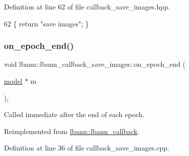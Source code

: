 Definition at line 62 of file callback\+\_\+save\+\_\+images.\+hpp.


\begin{DoxyCode}
62 \{ \textcolor{keywordflow}{return} \textcolor{stringliteral}{"save images"}; \}
\end{DoxyCode}
\mbox{\label{classlbann_1_1lbann__callback__save__images_aa540916eef9b95db68889a8a7426779c}} 
\subsubsection{\texorpdfstring{on\+\_\+epoch\+\_\+end()}{on\_epoch\_end()}}
{\footnotesize\ttfamily void lbann\+::lbann\+\_\+callback\+\_\+save\+\_\+images\+::on\+\_\+epoch\+\_\+end (\begin{DoxyParamCaption}\item[{\hyperlink{classlbann_1_1model}{model} $\ast$}]{m }\end{DoxyParamCaption})\hspace{0.3cm}{\ttfamily [override]}, {\ttfamily [virtual]}}

Called immediate after the end of each epoch. 

Reimplemented from \hyperlink{classlbann_1_1lbann__callback_a1fc71110e7f754bf73c9e0f344a448a5}{lbann\+::lbann\+\_\+callback}.



Definition at line 36 of file callback\+\_\+save\+\_\+images.\+cpp.



